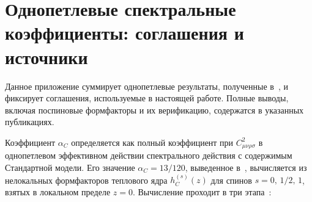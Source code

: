 \documentclass[12pt,a4paper]{article}
\theoremstyle{plain}
\theoremstyle{definition}
\theoremstyle{remark}
\begin{document}
\section{Однопетлевые спектральные коэффициенты: соглашения и источники}
\label{app:alpha}

Данное приложение суммирует однопетлевые результаты, полученные
в~\cite{Alfyorov:2026ff,Alfyorov:2026ct,Alfyorov:2026ss}, и
фиксирует соглашения, используемые в настоящей работе.  Полные
выводы, включая поспиновые формфакторы и их верификацию, содержатся
в указанных публикациях.

Коэффициент $\alpha_C$ определяется как полный коэффициент при
$C_{\mu\nu\rho\sigma}^2$ в однопетлевом эффективном действии
спектрального действия с содержимым Стандартной модели.  Его
значение $\alpha_C = 13/120$, выведенное
в~\cite{Alfyorov:2026ff}, вычисляется из нелокальных
формфакторов теплового ядра $h_C^{(s)}(z)$ для спинов
$s = 0,\, 1/2,\, 1$, взятых в локальном пределе $z = 0$.
Вычисление проходит в три
этапа~\cite{Alfyorov:2026ff}:
\end{document}
